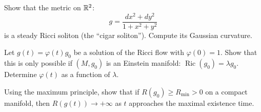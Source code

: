 \begin{exercise}
Show that the metric on $\mathbb{R}^2$:
\[
    g = \frac{dx^2 + dy^2}{1 + x^2 + y^2}
\]
is a steady Ricci soliton (the ``cigar soliton''). Compute its Gaussian curvature.
\end{exercise}

\begin{exercise}
Let $g(t) = \varphi(t) g_0$ be a solution of the Ricci flow with $\varphi(0) = 1$.
Show that this is only possible if $(M, g_0)$ is an Einstein manifold:
$\operatorname{Ric}(g_0) = \lambda g_0$. Determine $\varphi(t)$ as a function of
$\lambda$.
\end{exercise}

\begin{exercise}
Using the maximum principle, show that if $R(g_0) \geq R_{\min} > 0$ on a compact
manifold, then $R(g(t)) \to +\infty$ as $t$ approaches the maximal existence time.
\end{exercise}

